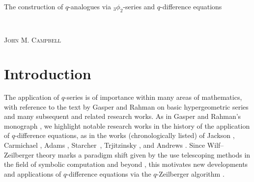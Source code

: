 \documentclass[12pt]{article}
\begin{document}
\begin{center}
{\Large The construction of $q$-analogues via $_3\phi_2$-series and $q$-difference equations}

 \ 

{\textsc{John M. Campbell}}

\end{center}

\begin{abstract}
 We apply the {\tt EKHAD}-normalization method given in our recent work to obtain, via the $q$-version of Zeilberger's algorithm,
 $q$-WZ pairs $(F, G)$ such that $\sum_{k = 0}^{\infty} F(0, k)$ may be expressed as a basic hypergeometric series of the form 
 ${}_{3}\phi_2$ with multiple free parameters, and in such a way so that $\sum_{k=0}^{\infty} F(0, k) = \sum_{n=0}^{\infty} G(n, 0)$. In 
 contrast to how previous applications of {\tt EKHAD}-normalization relied on $q$-analogues for specific WZ pairs introduced by 
 Guillera, our multiparameter approach provides a broad framework in the construction of $q$-analogues for accelerated series for 
 universal constants such as $\pi$. We apply this multiparameter version of {\tt EKHAD}-normalization to obtain and prove new 
 $q$-analogues for accelerated hypergeometric series attributed to many authors, including (alphabetically) Adamchik and Wagon, 
 Ap\'{e}ry, Chu, Chu and Zhang, Fabry, Guillera, Ramanujan, and Zeilberger. 
\end{abstract}

\vspace{0.1in}


\vspace{0.1in}


\section{Introduction}
 The application of $q$-series is of importance within many areas of mathematics, with reference to the text by Gasper and Rahman on 
 basic hypergeometric series \cite{GasperRahman2004} and many subsequent and related research works. As in Gasper and Rahman's 
 monograph \cite[p.\ 36]{GasperRahman2004}, we highlight notable research works in the history of the application of $q$-difference 
 equations, as in the works (chronologically listed) of Jackson \cite{Jackson1910q}, Carmichael \cite{Carmichael1912}, Adams 
 \cite{Adams1931}, Starcher~\cite{Starcher1931}, Trjitzinsky \cite{Trjitzinsky1933}, and Andrews \cite{Andrews1968}. Since
 Wilf--Zeilberger theory marks a paradigm shift \cite{PetkovsekWilfZeilberger1996} given by the use telescoping methods in the field of 
 symbolic computation and beyond \cite{Zeilberger1991}, this motivates new developments and applications of $q$-difference 
 equations via the $q$-Zeilberger algorithm \cite[\S6]{PetkovsekWilfZeilberger1996}. 
\end{document}

